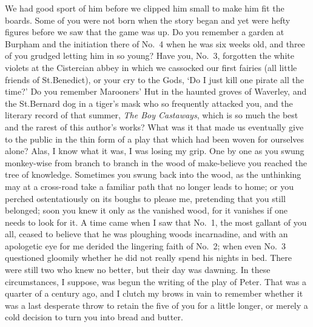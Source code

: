 We had good sport of him before we clipped him small to make him fit the boards.
Some of you were not born when the story began
and yet were hefty figures before we saw that the game was up.
Do you remember a garden at Burpham and the initiation there of No.~4 when he was six weeks old,
and three of you grudged letting him in so young?
Have you, No.~3, forgotten the white violets at the Cistercian abbey
in which we cassocked our first fairies
(all little friends of St.\@ Benedict),
or your cry to the Gods, ‘Do I just kill one pirate all the time?’
Do you remember Marooners’ Hut in the haunted groves of Waverley,
and the St.\@ Bernard dog in a tiger’s mask who so frequently attacked you,
and the literary record of that summer, \emph{The Boy Castaways},
which is so much the best and the rarest of this author’s works?
What was it that made us eventually give to the public in the thin form of a play
that which had been woven for ourselves alone?
Alas, I know what it was, I was losing my grip.
One by one as you swung monkey-wise from branch to branch in the wood of make-believe
you reached the tree of knowledge.
Sometimes you swung back into the wood,
as the unthinking may at a cross-road take a familiar path that no longer leads to home;
or you perched ostentatiously on its boughs to please me,
pretending that you still belonged;
soon you knew it only as the vanished wood,
for it vanishes if one needs to look for it.
A time came when I saw that No.~1, the most gallant of you all,
ceased to believe that he was ploughing woods incarnadine,
and with an apologetic eye for me derided the lingering faith of No.~2;
when even No.~3 questioned gloomily whether he did not really spend his nights in bed.
There were still two who knew no better, but their day was dawning.
In these circumstances, I suppose, was begun the writing of the play of Peter.
That was a quarter of a century ago,
and I clutch my brows in vain to remember
whether it was a last desperate throw to retain the five of you for a little longer,
or merely a cold decision to turn you into bread and butter.

